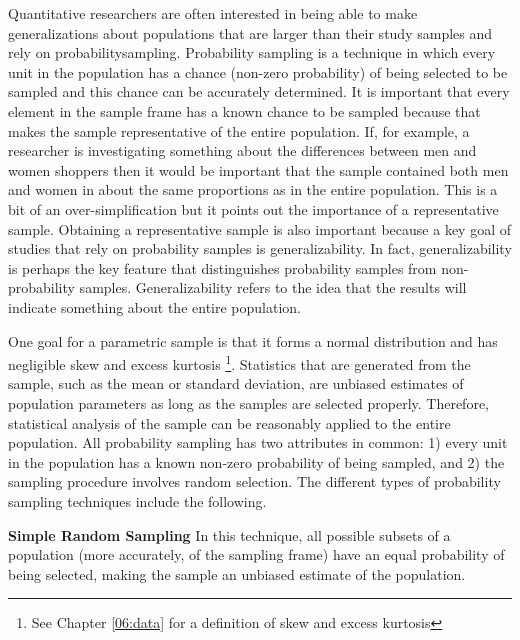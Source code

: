 Quantitative researchers are often interested in being able to make generalizations about populations that are larger than their study samples and rely on \gls{probabilitysampling}. Probability sampling is a technique in which every unit in the population has a chance (non-zero probability) of being selected to be sampled and this chance can be accurately determined. It is important that every element in the sample frame has a known chance to be sampled because that makes the sample representative of the entire population. If, for example, a researcher is investigating something about the differences between men and women shoppers then it would be important that the sample contained both men and women in about the same proportions as in the entire population. This is a bit of an over-simplification but it points out the importance of a representative sample. Obtaining a representative sample is also important because a key goal of studies that rely on probability samples is generalizability. In fact, generalizability is perhaps the key feature that distinguishes probability samples from non-probability samples. Generalizability refers to the idea that the results will indicate something about the entire population.

One goal for a parametric sample is that it forms a normal distribution and has negligible skew and excess kurtosis \footnote{See Chapter \ref{06:data} for a definition of skew and excess kurtosis}. Statistics that are generated from the sample, such as the mean or standard deviation, are unbiased estimates of population parameters as long as the samples are selected properly. Therefore, statistical analysis of the sample can be reasonably applied to the entire population. All probability sampling has two attributes in common: 1) every unit in the population has a known non-zero probability of being sampled, and 2) the sampling procedure involves random selection. The different types of probability sampling techniques include the following.

\textbf{Simple Random Sampling} In this technique, all possible subsets of a population (more accurately, of the sampling frame) have an equal probability of being selected, making the sample an unbiased estimate of the population. 


